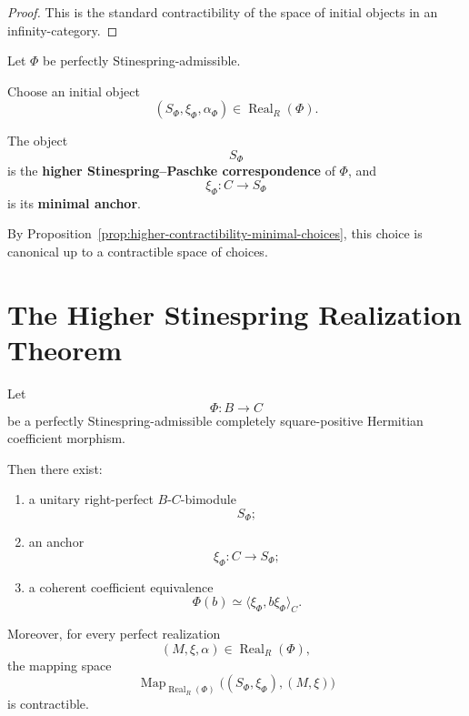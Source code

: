\begin{proof}
This is the standard contractibility of the space of initial objects in an
infinity-category.
\end{proof}

\begin{definition}
\label{def:higher-stinespring-correspondence}
Let \(\Phi\) be perfectly Stinespring-admissible.

Choose an initial object
\[
  (S_\Phi,\xi_\Phi,\alpha_\Phi)
  \in
  \operatorname{Real}_R(\Phi).
\]

The object
\[
  S_\Phi
\]
is the \textbf{higher Stinespring--Paschke correspondence} of \(\Phi\), and
\[
  \xi_\Phi:C\to S_\Phi
\]
is its \textbf{minimal anchor}.
\end{definition}

By Proposition~\ref{prop:higher-contractibility-minimal-choices}, this choice
is canonical up to a contractible space of choices.

\section{The Higher Stinespring Realization Theorem}
\label{sec:higher-stinespring-realization}

\begin{theorem}
\label{thm:higher-stinespring-realization}
Let
\[
  \Phi:B\to C
\]
be a perfectly Stinespring-admissible completely square-positive Hermitian
coefficient morphism.

Then there exist:

\begin{enumerate}
  \item a unitary right-perfect \(B\)-\(C\)-bimodule
  \[
    S_\Phi;
  \]

  \item an anchor
  \[
    \xi_\Phi:C\to S_\Phi;
  \]

  \item a coherent coefficient equivalence
  \[
    \Phi(b)
    \simeq
    \langle\xi_\Phi,b\xi_\Phi\rangle_C.
  \]
\end{enumerate}

Moreover, for every perfect realization
\[
  (M,\xi,\alpha)
  \in
  \operatorname{Real}_R(\Phi),
\]
the mapping space
\[
  \operatorname{Map}_{\operatorname{Real}_R(\Phi)}
  \bigl(
    (S_\Phi,\xi_\Phi),
    (M,\xi)
  \bigr)
\]
is contractible.
\end{theorem}

